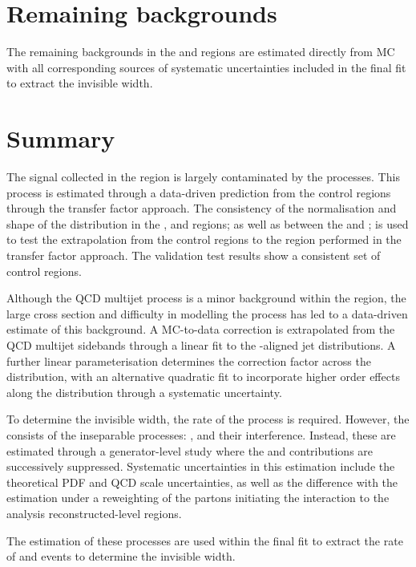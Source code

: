\section{Remaining backgrounds}

The remaining backgrounds in the \metplusjets and \diellplusjets regions are
estimated directly from MC with all corresponding sources of systematic
uncertainties included in the final fit to extract the \PZ invisible width.


\section{Summary}

The \IZvvj signal collected in the \metplusjets region is largely contaminated by the \IWlvj processes. This process is estimated through a data-driven prediction from the \ellplusjets control regions through the transfer factor approach. The consistency of the normalisation and shape of the \recoil distribution in the \muplusjets, \eleplusjets and \tauplusjets regions; as well as between the \mupplusjets and \munplusjets; is used to test the extrapolation from the control regions to the \metplusjets region performed in the transfer factor approach. The validation test results show a consistent set of control regions.

Although the QCD multijet process is a minor background within the \metplusjets region, the large cross section and difficulty in modelling the process has led to a data-driven estimate of this background. A MC-to-data correction is extrapolated from the QCD multijet sidebands through a linear fit to the \ptmiss-aligned jet \pt distributions. A further linear parameterisation determines the correction factor across the \recoil distribution, with an alternative quadratic fit to incorporate higher order effects along the \recoil distribution through a systematic uncertainty.

To determine the \PZ invisible width, the rate of the \IZll process is required. However, the \diellplusjets consists of the inseparable processes: \IZll, \Igstarll and their interference. Instead, these are estimated through a generator-level study where the \PZ and \Pgstar contributions are successively suppressed. Systematic uncertainties in this estimation include the theoretical PDF and QCD scale uncertainties, as well as the difference with the estimation under a reweighting of the partons initiating the interaction to the analysis reconstructed-level regions.

The estimation of these processes are used within the final fit to extract the rate of \IZvvj and \IZllj events to determine the \PZ invisible width.